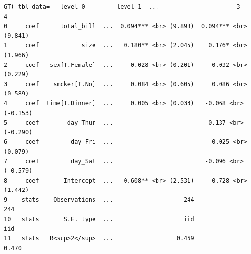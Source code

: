 \documentclass[
  letterpaper,
  DIV=11,
  numbers=noendperiod]{scrreprt}
\begin{document}
\begin{verbatim}
GT(_tbl_data=   level_0         level_1  ...                      3                      4
0     coef      total_bill  ...  0.094*** <br> (9.898)  0.094*** <br> (9.841)
1     coef            size  ...   0.180** <br> (2.045)    0.176* <br> (1.966)
2     coef   sex[T.Female]  ...     0.028 <br> (0.201)     0.032 <br> (0.229)
3     coef    smoker[T.No]  ...     0.084 <br> (0.605)     0.086 <br> (0.589)
4     coef  time[T.Dinner]  ...     0.005 <br> (0.033)   -0.068 <br> (-0.153)
5     coef        day_Thur  ...                          -0.137 <br> (-0.290)
6     coef         day_Fri  ...                            0.025 <br> (0.079)
7     coef         day_Sat  ...                          -0.096 <br> (-0.579)
8     coef       Intercept  ...   0.608** <br> (2.531)     0.728 <br> (1.442)
9    stats    Observations  ...                    244                    244
10   stats       S.E. type  ...                    iid                    iid
11   stats   R<sup>2</sup>  ...                  0.469                  0.470


\end{verbatim}
\end{document}

